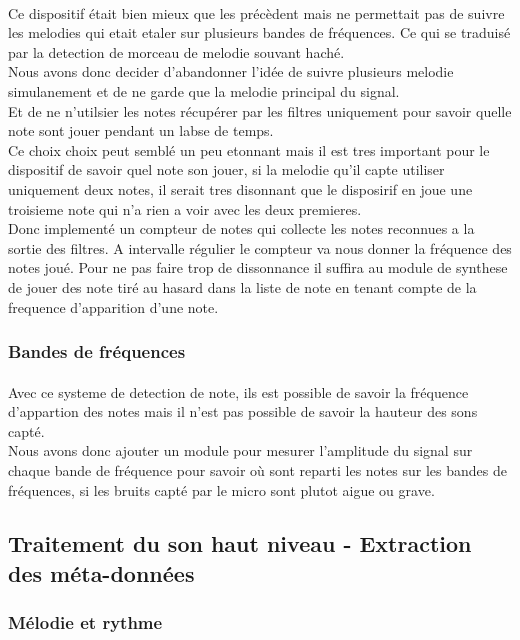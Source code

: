 \documentclass[a4paper, titlepage, oneside, 12pt]{article}%
\begin{document}
\paragraph{}
Ce dispositif était bien mieux que les précèdent mais ne permettait pas de suivre les melodies qui etait etaler sur plusieurs bandes de fréquences. Ce qui se traduisé par la detection de morceau de melodie souvant haché.\\
Nous avons donc decider d'abandonner l'idée de suivre plusieurs melodie simulanement et de ne garde que la melodie principal du signal. \\
Et de ne n'utilsier les notes récupérer par les filtres uniquement  pour savoir quelle note sont jouer pendant un labse de temps.\\
Ce choix choix peut semblé un peu etonnant mais il est tres important pour le dispositif de savoir quel note son jouer, si la melodie qu'il capte utiliser uniquement deux notes, il serait tres disonnant que le disposirif en joue une troisieme note qui n'a rien a voir avec les deux premieres.\\
Donc implementé un compteur de notes qui collecte les notes reconnues a la sortie des filtres. A intervalle régulier le compteur va nous donner la fréquence des notes joué. Pour ne pas faire trop de dissonnance il suffira au module de synthese de jouer des note tiré au hasard dans la liste de note en tenant compte de la frequence d'apparition d'une note.

\subsubsection{Bandes de fréquences}
\paragraph{}
Avec ce systeme de detection de note, ils est possible de savoir la fréquence d'appartion des notes mais il n'est pas possible de savoir la hauteur des sons capté.\\
Nous avons donc ajouter un module pour mesurer l'amplitude du signal sur chaque bande de fréquence pour savoir où sont reparti les notes sur les bandes de fréquences, si les bruits capté par le micro sont plutot aigue ou grave.

\subsection{Traitement du son haut niveau - Extraction des méta-données}
\subsubsection{Mélodie et rythme}
\end{document}
